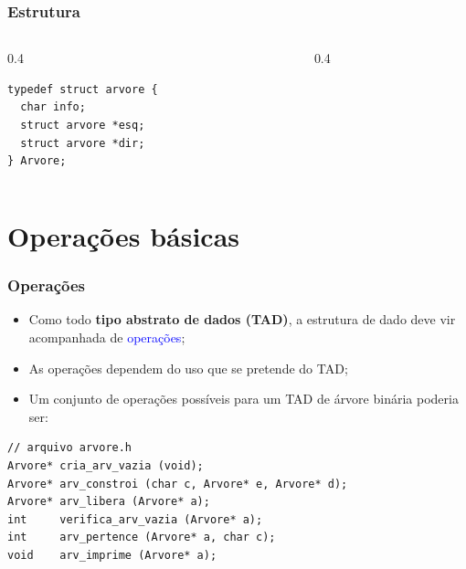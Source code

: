\documentclass{beamer}
\newcommand{\tcb}[1]{\textcolor{blue}{#1}}
\begin{document}
\begin{frame}[fragile,t]
  \frametitle{Estrutura}

  \begin{columns}
    \begin{column}{0.4\textwidth}
      \begin{verbatim}
typedef struct arvore {
  char info;
  struct arvore *esq;
  struct arvore *dir;
} Arvore;
      \end{verbatim}
    \end{column}
    \begin{column}{0.4\textwidth}
      \centering
    \end{column}
  \end{columns}
  
  \vspace{1cm}

\end{frame}

\section{Operações básicas}

\begin{frame}[fragile]
  \frametitle{Operações}

  \begin{itemize}
    \item Como todo \textbf{tipo abstrato de dados (TAD)}, a estrutura de dado deve vir acompanhada de \tcb{operações};
    \item As operações dependem do uso que se pretende do TAD;
    \item Um conjunto de operações possíveis para um TAD de árvore binária poderia ser:
  \end{itemize}

  \begin{verbatim}
// arquivo arvore.h
Arvore* cria_arv_vazia (void);
Arvore* arv_constroi (char c, Arvore* e, Arvore* d);
Arvore* arv_libera (Arvore* a);
int     verifica_arv_vazia (Arvore* a);
int     arv_pertence (Arvore* a, char c);
void    arv_imprime (Arvore* a);
  \end{verbatim}
\end{frame}
\end{document}
